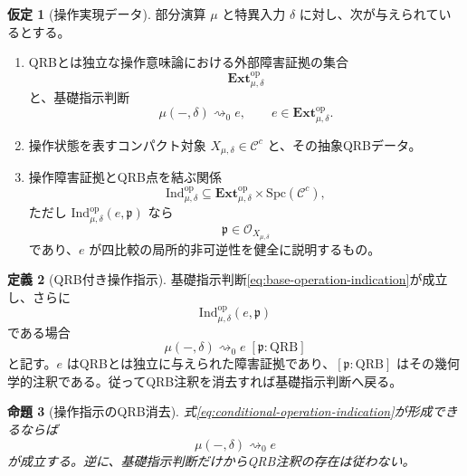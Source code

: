 \documentclass[a4paper,11pt]{ltjsarticle}
\theoremstyle{definition}
\newtheorem{definition}{定義}[section]
\newtheorem{assumption}[definition]{仮定}
\theoremstyle{plain}
\newtheorem{proposition}[definition]{命題}
\newcommand{\QRB}{\mathrm{QRB}}
\newcommand{\Spc}{\mathrm{Spc}}
\newcommand{\Ext}{\mathbf{Ext}}
\newcommand{\Ind}{\mathrm{Ind}}
\begin{document}
\begin{assumption}[操作実現データ]
部分演算 $\mu$ と特異入力 $\delta$ に対し、次が与えられているとする。
\begin{enumerate}
 \item QRBとは独立な操作意味論における外部障害証拠の集合
 \begin{equation}
  \Ext^{\mathrm{op}}_{\mu,\delta}
 \end{equation}
 と、基礎指示判断
 \begin{equation}
  \mu(-,\delta)\rightsquigarrow_0 e,
  \qquad
  e\in\Ext^{\mathrm{op}}_{\mu,\delta}.
  \label{eq:base-operation-indication}
 \end{equation}
 \item 操作状態を表すコンパクト対象 $X_{\mu,\delta}\in\mathcal C^c$ と、その抽象QRBデータ。
 \item 操作障害証拠とQRB点を結ぶ関係
 \begin{equation}
  \Ind^{\mathrm{op}}_{\mu,\delta}
  \subseteq
  \Ext^{\mathrm{op}}_{\mu,\delta}
  \times\Spc(\mathcal C^c),
  \label{eq:operation-indication-relation}
 \end{equation}
 ただし $\Ind^{\mathrm{op}}_{\mu,\delta}(e,\mathfrak p)$ なら
 \begin{equation}
  \mathfrak p\in\mathcal O_{X_{\mu,\delta}}
 \end{equation}
 であり、$e$ が四比較の局所的非可逆性を健全に説明するもの。
\end{enumerate}
\end{assumption}

\begin{definition}[QRB付き操作指示]
基礎指示判断\eqref{eq:base-operation-indication}が成立し、さらに
\begin{equation}
 \Ind^{\mathrm{op}}_{\mu,\delta}(e,\mathfrak p)
\end{equation}
である場合
\begin{equation}
 \mu(-,\delta)
 \rightsquigarrow_0 e
 \;[\mathfrak p:\QRB]
 \label{eq:conditional-operation-indication}
\end{equation}
と記す。$e$ はQRBとは独立に与えられた障害証拠であり、$[\mathfrak p:\QRB]$ はその幾何学的注釈である。従ってQRB注釈を消去すれば基礎指示判断へ戻る。
\end{definition}

\begin{proposition}[操作指示のQRB消去]
式\eqref{eq:conditional-operation-indication}が形成できるならば
\begin{equation}
 \mu(-,\delta)\rightsquigarrow_0 e
\end{equation}
が成立する。逆に、基礎指示判断だけからQRB注釈の存在は従わない。
\end{proposition}
\end{document}
